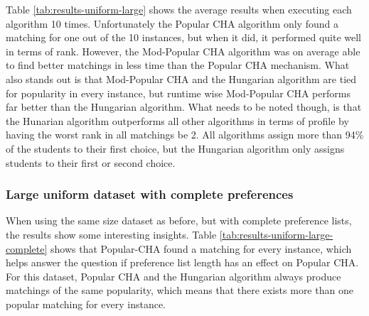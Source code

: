 \begin{table}[h!]
  \centering
  \caption{Average results for large uniform dataset with incomplete preferences.}
  \label{tab:results-uniform-large}
\end{table}

Table \ref{tab:results-uniform-large} shows the average results when executing each algorithm 10 times. Unfortunately the Popular CHA algorithm only found a matching for one out of the 10 instances, but when it did, it performed quite well in terms of rank. However, the Mod-Popular CHA algorithm was on average able to find better matchings in less time than the Popular CHA mechanism. What also stands out is that Mod-Popular CHA and the Hungarian algorithm are tied for popularity in every instance, but runtime wise Mod-Popular CHA performs far better than the Hungarian algorithm. What needs to be noted though, is that the Hunarian algorithm outperforms all other algorithms in terms of profile by having the worst rank in all matchings be 2. All algorithms assign more than 94\% of the students to their first choice, but the Hungarian algorithm only assigns students to their first or second choice.  

\subsubsection{Large uniform dataset with complete preferences}
When using the same size dataset as before, but with complete preference lists, the results show some interesting insights. Table \ref{tab:results-uniform-large-complete} shows that Popular-CHA found a matching for every instance, which helps answer the question if preference list length has an effect on Popular CHA. For this dataset, Popular CHA and the Hungarian algorithm always produce matchings of the same popularity, which means that there exists more than one popular matching for every instance. 

